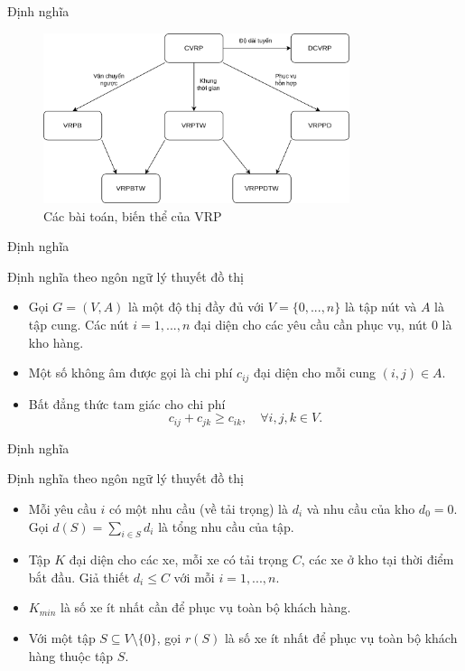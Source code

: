 \begin{frame}{Định nghĩa}
    \begin{figure}[H] %
        \centering %
        \includegraphics[width=0.8\textwidth]{figures/vrp.png} 
        \caption{Các bài toán, biến thể của VRP} %
        \label{fig:fg_01}
      \end{figure}
\end{frame}

\begin{frame}{Định nghĩa}
    \begin{block}{Định nghĩa theo ngôn ngữ lý thuyết đồ thị}
        \begin{itemize}
            \item Gọi $G=(V,A)$ là một độ thị đầy đủ với $V=\{ 0, ..., n \}$ là tập nút và $A$ là tập cung. Các nút $i=1,...,n$ đại diện cho các yêu cầu cần phục vụ, nút $0$ là kho hàng.
            \item Một số không âm được gọi là chi phí $c_{ij}$ đại diện cho mỗi cung $(i,j) \in A$.
            \item Bất đẳng thức tam giác cho chi phí
            \begin{equation}
                c_{ij} + c_{jk} \geq c_{ik}, \quad \forall i,j,k \in V.
            \end{equation}
        \end{itemize}
    \end{block}
\end{frame}

\begin{frame}{Định nghĩa}
    \begin{block}{Định nghĩa theo ngôn ngữ lý thuyết đồ thị}
        \begin{itemize}
            \item Mỗi yêu cầu $i$ có một nhu cầu (về tải trọng) là $d_i$ và nhu cầu của kho $d_0=0$. Gọi $d(S) = \sum_{i \in S} d_i$ là tổng nhu cầu của tập.
            \item Tập $K$ đại diện cho các xe, mỗi xe có tải trọng $C$, các xe ở kho tại thời điểm bắt đầu. Giả thiết $d_i \leq C$ với mỗi $i=1,...,n$.
            \item $K_{min}$ là số xe ít nhất cần để phục vụ toàn bộ khách hàng.
            \item Với một tập $S \subseteq V \setminus \{0\}$, gọi $r(S)$ là số xe ít nhất để phục vụ toàn bộ khách hàng thuộc tập $S$.
        \end{itemize}
    \end{block}
\end{frame}

